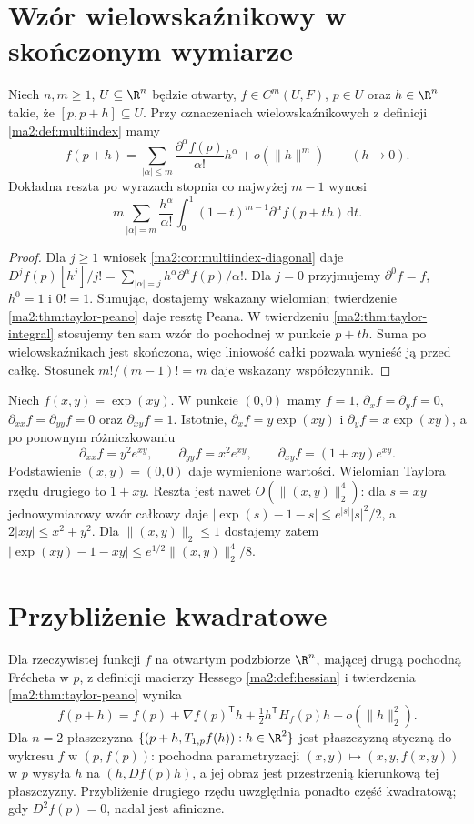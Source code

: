 \section{Wzór wielowskaźnikowy w skończonym wymiarze}
\begin{wniosek}
\label{ma2:cor:taylor-multiindex}
Niech $n,m\ge1$, $U\subseteq\R^n$ będzie otwarty,
$f\in C^m(U,F)$, $p\in U$ oraz $h\in\R^n$ takie,
że $[p,p+h]\subseteq U$.
Przy oznaczeniach wielowskaźnikowych z definicji
\ref{ma2:def:multiindex} mamy
\[
 f(p+h)=\sum_{|\alpha|\le m}
       \frac{\partial^\alpha f(p)}{\alpha!}h^\alpha
       +o(\|h\|^m)\qquad(h\to0).
\]
Dokładna reszta po wyrazach stopnia co najwyżej $m-1$
wynosi
\[
 m\sum_{|\alpha|=m}\frac{h^\alpha}{\alpha!}
        \int_0^1(1-t)^{m-1}\partial^\alpha f(p+th)\,\mathrm dt .
\]
\end{wniosek}
\begin{proof}
Dla $j\ge1$ wniosek \ref{ma2:cor:multiindex-diagonal}
daje $D^jf(p)[h^j]/j!
=\sum_{|\alpha|=j} h^\alpha\partial^\alpha f(p)/\alpha!$.
Dla $j=0$ przyjmujemy $\partial^0 f=f$, $h^0=1$
i $0!=1$. Sumując, dostajemy wskazany wielomian;
twierdzenie \ref{ma2:thm:taylor-peano} daje resztę Peana.
W twierdzeniu \ref{ma2:thm:taylor-integral} stosujemy
ten sam wzór do pochodnej w punkcie $p+th$.
Suma po wielowskaźnikach jest skończona, więc liniowość
całki pozwala wynieść ją przed całkę. Stosunek
$m!/(m-1)!=m$ daje wskazany współczynnik.
\end{proof}
\begin{przyklad}
\label{ma2:ex:taylor-exp-product}
Niech $f(x,y)=\exp(xy)$. W punkcie $(0,0)$ mamy
$f=1$, $\partial_x f=\partial_y f=0$,
$\partial_{xx}f=\partial_{yy}f=0$ oraz
$\partial_{xy}f=1$. Istotnie,
$\partial_x f=y\exp(xy)$ i $\partial_y f=x\exp(xy)$,
a po ponownym różniczkowaniu
\[
 \partial_{xx}f=y^2 e^{xy},\qquad
 \partial_{yy}f=x^2 e^{xy},\qquad
 \partial_{xy}f=(1+xy)e^{xy}.
\]
Podstawienie $(x,y)=(0,0)$ daje wymienione wartości.
Wielomian Taylora rzędu drugiego to $1+xy$.
Reszta jest nawet $O(\|(x,y)\|_2^4)$: dla $s=xy$
jednowymiarowy wzór całkowy daje
$|\exp(s)-1-s|\le e^{|s|}|s|^2/2$,
a $2|xy|\le x^2+y^2$.
Dla $\|(x,y)\|_2\le1$ dostajemy zatem
$|\exp(xy)-1-xy|\le e^{1/2}\|(x,y)\|_2^4/8$.
\end{przyklad}


\section{Przybliżenie kwadratowe}
Dla rzeczywistej funkcji $f$ na otwartym podzbiorze
$\R^n$, mającej drugą pochodną Frécheta w $p$,
z definicji macierzy Hessego \ref{ma2:def:hessian}
i twierdzenia \ref{ma2:thm:taylor-peano} wynika
\[
 f(p+h)=f(p)+\nabla f(p)^{\mathsf T}h
   +\tfrac12 h^{\mathsf T}H_f(p)h+o(\|h\|_2^2).
\]
Dla $n=2$ płaszczyzna
$\{(p+h,T_{1,p}f(h)):h\in\R^2\}$ jest płaszczyzną
styczną do wykresu $f$ w $(p,f(p))$: pochodna
parametryzacji $(x,y)\mapsto(x,y,f(x,y))$ w $p$
wysyła $h$ na $(h,Df(p)h)$, a jej obraz jest
przestrzenią kierunkową tej płaszczyzny.
Przybliżenie drugiego rzędu uwzględnia ponadto
część kwadratową; gdy $D^2f(p)=0$, nadal jest afiniczne.

